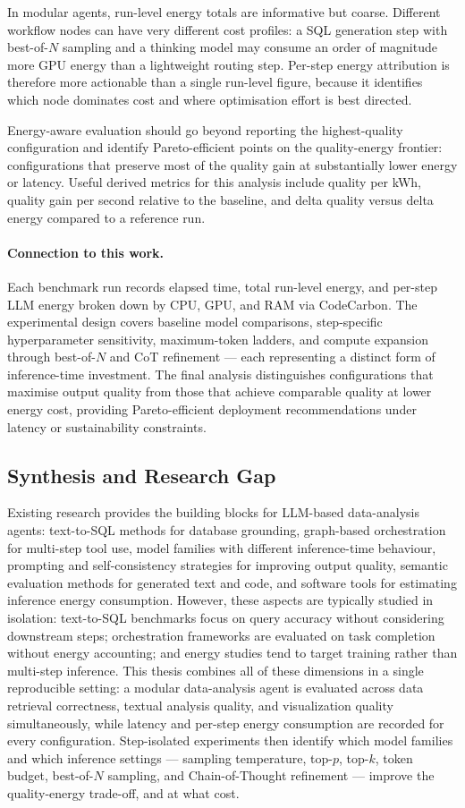 In modular agents, run-level energy totals are informative but coarse.
Different workflow nodes can have very different cost profiles: a SQL generation
step with best-of-$N$ sampling and a thinking model may consume an order of
magnitude more GPU energy than a lightweight routing step.
Per-step energy attribution is therefore more actionable than a single run-level
figure, because it identifies which node dominates cost and where optimisation
effort is best directed.

Energy-aware evaluation should go beyond reporting the highest-quality
configuration and identify Pareto-efficient points on the quality-energy
frontier: configurations that preserve most of the quality gain at
substantially lower energy or latency.
Useful derived metrics for this analysis include quality per kWh, quality gain
per second relative to the baseline, and delta quality versus delta energy
compared to a reference run.

\paragraph{Connection to this work.}
Each benchmark run records elapsed time, total run-level energy, and per-step
LLM energy broken down by CPU, GPU, and RAM via CodeCarbon.
The experimental design covers baseline model comparisons, step-specific
hyperparameter sensitivity, maximum-token ladders, and compute expansion through
best-of-$N$ and CoT refinement --- each representing a distinct form of
inference-time investment.
The final analysis distinguishes configurations that maximise output quality
from those that achieve comparable quality at lower energy cost, providing
Pareto-efficient deployment recommendations under latency or sustainability
constraints.

\subsection{Synthesis and Research Gap}
\label{sec:gap}
Existing research provides the building blocks for LLM-based data-analysis
agents: text-to-SQL methods for database grounding, graph-based orchestration
for multi-step tool use, model families with different inference-time behaviour,
prompting and self-consistency strategies for improving output quality, semantic
evaluation methods for generated text and code, and software tools for
estimating inference energy consumption.
However, these aspects are typically studied in isolation: text-to-SQL
benchmarks focus on query accuracy without considering downstream steps;
orchestration frameworks are evaluated on task completion without energy
accounting; and energy studies tend to target training rather than multi-step
inference.
This thesis combines all of these dimensions in a single reproducible setting:
a modular data-analysis agent is evaluated across data retrieval correctness,
textual analysis quality, and visualization quality simultaneously, while
latency and per-step energy consumption are recorded for every configuration.
Step-isolated experiments then identify which model families and which
inference settings --- sampling temperature, top-$p$, top-$k$,
token budget, best-of-$N$ sampling, and Chain-of-Thought refinement --- improve the
quality-energy trade-off, and at what cost.
